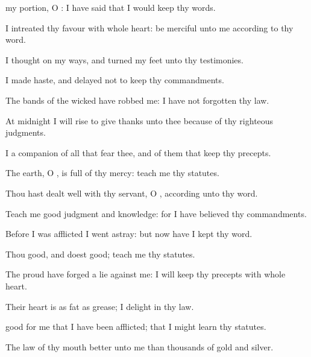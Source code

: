 {\Q {} my
portion, O
{}: I have
said that I would
keep thy
words.


\par }{\Q {}I
intreated thy
favour with
{} whole
heart: be
merciful unto me according to thy
word.


\par }{\BB \par }
{\Q {}I
thought on my
ways, and
turned my
feet unto thy
testimonies.


\par }{\Q {}I made
haste, and
delayed not to
keep thy
commandments.


\par }{\Q {}The
bands of the
wicked have
robbed me:
{} I have not
forgotten thy
law.


\par }{\Q {}At
midnight I will
rise to give
thanks unto thee because of thy
righteous
judgments.


\par }{\Q {}I
{} a
companion of all
{} that
fear thee, and of them that
keep thy
precepts.


\par }{\Q {}The
earth, O
{}, is
full of thy
mercy:
teach me thy
statutes.


\par }{\BB \par }
{
\par }
{\Q {}Thou hast
dealt
well with thy
servant, O
{}, according unto thy
word.


\par }{\Q {}Teach me
good
judgment and
knowledge: for I have
believed thy
commandments.


\par }{\Q {}Before I was
afflicted I went
astray: but now have I
kept thy
word.


\par }{\Q {}Thou
{}
good, and doest
good;
teach me thy
statutes.


\par }{\BB \par }
{\Q {}The
proud have
forged a
lie against me:
{} I will
keep thy
precepts with
{} whole
heart.


\par }{\Q {}Their
heart is as
fat as
grease;
{} I
delight in thy
law.


\par }{\Q {}
good for me that I have been
afflicted; that I might
learn thy
statutes.


\par }{\Q {}The
law of thy
mouth
{}
better unto me than
thousands of
gold and
silver.


\par }{
\par }
